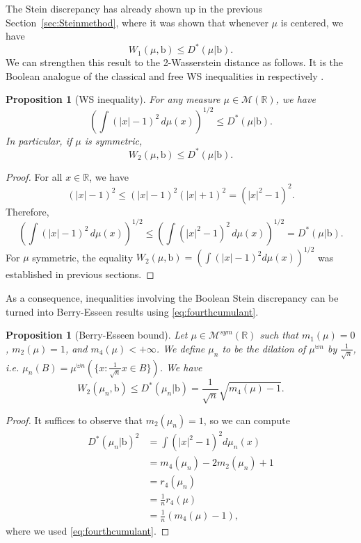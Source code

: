 \documentclass[10pt, reqno]{amsart}
\numberwithin{equation}{section}
\theoremstyle{definition}
\theoremstyle{plain}
\newtheorem{proposition}[definition]{Proposition}
\theoremstyle{remark}
\newcommand{\1}{\mathbbm{1}}
\begin{document}
The Stein discrepancy has already shown up in the previous Section~\ref{sec:Steinmethod}, where it was shown that whenever $\mu$ is centered, we have
$$W_1(\mu,\mathbb{\mathrm{b}})\leq  D^*(\mu|\mathbb{\mathrm{b}}).$$
We can strengthen this result to the 2-Wasserstein distance as follows. It is the Boolean analogue of the classical and free WS inequalities in respectively \cite{ledoux2015stein,cebron2021quantitative}.
\begin{proposition}[WS inequality]\label{prop:WS}
    For any measure $\mu\in \mathcal{M}(\mathbb{R})$, we have
$$\left(\int (|x|-1)^2\,d\mu(x)\right)^{1/2}\leq  D^*(\mu|\mathbb{\mathrm{b}}).$$
In particular, if $\mu$ is symmetric,
$$W_2(\mu,\mathbb{\mathrm{b}})\leq  D^*(\mu|\mathbb{\mathrm{b}}).$$
\end{proposition}
\begin{proof}
For all $x\in \mathbb{R}$, we have
$$(|x|-1)^2\leq (|x|-1)^2(|x|+1)^2=(|x|^2-1)^2.$$
Therefore,
$$\left(\int (|x|-1)^2\,d\mu(x)\right)^{1/2}\leq \left(\int (|x|^2-1)^2\,d\mu(x)\right)^{1/2}=D^*(\mu|\mathbb{\mathrm{b}}).$$
For $\mu$ symmetric, the equality $W_2(\mu,\mathbb{\mathrm{b}})=\left(\int (|x|-1)^2d\mu(x)\right)^{1/2}$
was established in previous sections.
\end{proof}
As a consequence, inequalities involving the Boolean Stein discrepancy can be turned into Berry-Esseen results using \eqref{eq:fourthcumulant}.
\begin{proposition}[Berry-Esseen bound]\label{prop:Berryesseen}Let $\mu\in \mathcal{M}^{sym}(\mathbb{R})$ such that $m_1(\mu) = 0$, $m_2(\mu) = 1$,
and $m_4(\mu) < +\infty$.  We define $\mu_n$ to be the dilation of $\mu^{\uplus n}$ by $\frac{1}{\sqrt{n}}$, i.e. $\mu_n(B)=\mu^{\uplus n}(\{x:\frac{1}{\sqrt{n}}x\in B\})$. We have
    $$W_2(\mu_n,\mathbb{\mathrm{b}})\leq D^*(\mu_n|\mathbb{\mathrm{b}})=\frac{1}{\sqrt{n}}\sqrt{m_4(\mu)-1}.$$
\end{proposition}
\begin{proof}
It suffices to observe that $m_2(\mu_n)=1$, so we can compute
\begin{align*}
  D^*(\mu_n|\mathbb{\mathrm{b}})^2&= \int (|x|^2-1)^2d\mu_n(x)\\
   &=m_4(\mu_n)-2m_2(\mu_n)+1\\
   &=r_4(\mu_n)\\
   &=\frac{1}{n}r_4(\mu)\\
   &=\frac{1}{n}(m_4(\mu)-1),
\end{align*}
where we used \eqref{eq:fourthcumulant}.
\end{proof}
\end{document}
